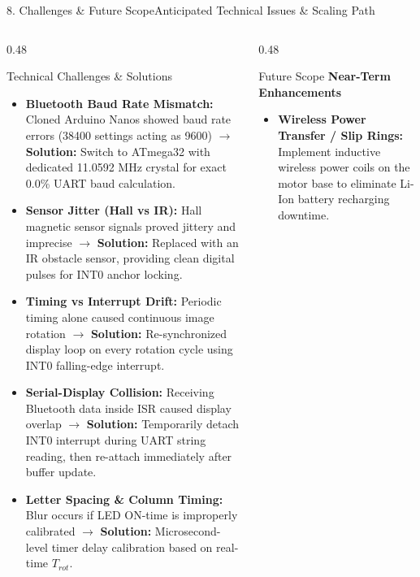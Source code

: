 \documentclass[aspectratio=169, 10pt]{beamer}
\begin{document}
\begin{frame}{8. Challenges \& Future Scope}{Anticipated Technical Issues \& Scaling Path}
    \begin{columns}[T]
        \begin{column}{0.48\textwidth}
            \begin{block}{Technical Challenges \& Solutions}
                \tiny
                \begin{itemize}
                    \item \textbf{Bluetooth Baud Rate Mismatch:} Cloned Arduino Nanos showed baud rate errors (38400 settings acting as 9600) $\rightarrow$ \textbf{Solution:} Switch to ATmega32 with dedicated 11.0592 MHz crystal for exact 0.0\% UART baud calculation.
                    \item \textbf{Sensor Jitter (Hall vs IR):} Hall magnetic sensor signals proved jittery and imprecise $\rightarrow$ \textbf{Solution:} Replaced with an IR obstacle sensor, providing clean digital pulses for INT0 anchor locking.
                    \item \textbf{Timing vs Interrupt Drift:} Periodic timing alone caused continuous image rotation $\rightarrow$ \textbf{Solution:} Re-synchronized display loop on every rotation cycle using INT0 falling-edge interrupt.
                    \item \textbf{Serial-Display Collision:} Receiving Bluetooth data inside ISR caused display overlap $\rightarrow$ \textbf{Solution:} Temporarily detach INT0 interrupt during UART string reading, then re-attach immediately after buffer update.
                    \item \textbf{Letter Spacing \& Column Timing:} Blur occurs if LED ON-time is improperly calibrated $\rightarrow$ \textbf{Solution:} Microsecond-level timer delay calibration based on real-time $T_{rot}$.
                \end{itemize}
            \end{block}
        \end{column}
        \begin{column}{0.48\textwidth}
            \begin{block}{Future Scope}
                \tiny
                \textbf{Near-Term Enhancements}
                \begin{itemize}
                    \item \textbf{Wireless Power Transfer / Slip Rings:} Implement inductive wireless power coils on the motor base to eliminate Li-Ion battery recharging downtime.

\end{itemize}
\end{block}
\end{column}
\end{columns}
\end{frame}
\end{document}
